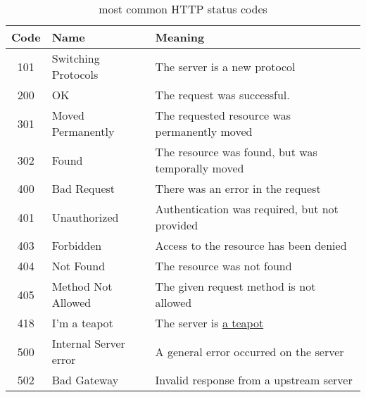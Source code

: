 \begin{table}[h]
	\centering
	\begin{tabular} {c | l | l}
		Code & Name                  & Meaning                                                                                             \\
		\hline
		101  & Switching Protocols   & The server is a new protocol                                                                        \\
		200  & OK                    & The request was successful.                                                                         \\
		301  & Moved Permanently     & The requested resource was permanently moved                                                        \\
		302  & Found                 & The resource was found, but was temporally moved                                                    \\
		400  & Bad Request           & There was an error in the request                                                                   \\
		401  & Unauthorized          & Authentication was required, but not provided                                                       \\
		403  & Forbidden             & Access to the resource has been denied                                                              \\
		404  & Not Found             & The resource was not found                                                                          \\
		405  & Method Not Allowed    & The given request method is not allowed                                                             \\
		418  & I'm a teapot          & The server is \href{https://en.wikipedia.org/wiki/Hyper_Text_Coffee_Pot_Control_Protocol}{a teapot} \\
		500  & Internal Server error & A general error occurred on the server                                                              \\
		502  & Bad Gateway           & Invalid response from a upstream server                                      \\
	\end{tabular}
	\caption{most common HTTP status codes}
\end{table}
